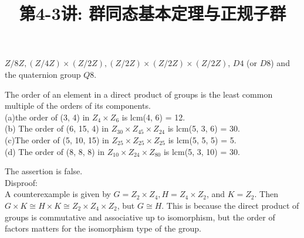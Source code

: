 \documentclass[a4paper, justified]{tufte-handout}
\title{第4-3讲: 群同态基本定理与正规子群}
\date{\zhtoday} %
\begin{document}
\maketitle
\noplagiarism %
\begin{abstract}
\end{abstract}
\beginrequired

\begin{problem}[TJ 9-11]
\end{problem}

\begin{solution}
	$Z/8Z, (Z/4Z) \times (Z/2Z), (Z/2Z) \times (Z/2Z) \times (Z/2Z)$, $D4$ (or $D8$) and the quaternion group $Q8$.
\end{solution}

\begin{problem}[TJ 9-16]
\end{problem}

\begin{solution}
	The order of an element in a direct product of groups is the least common multiple of the orders of its components.\\
	(a)the order of (3, 4) in $Z_4 \times Z_6$ is lcm(4, 6) = 12.\\
	(b) The order of (6, 15, 4) in $Z_{30} \times Z_{45} \times Z_{24}$ is lcm(5, 3, 6) = 30.\\
	(c)The order of (5, 10, 15) in $Z_{25} \times Z_{25} \times Z_{25}$ is lcm(5, 5, 5) = 5. \\
	(d) The order of (8, 8, 8) in $Z_{10} \times Z_{24} \times Z_{80}$ is lcm(5, 3, 10) = 30.
\end{solution}

\begin{problem}[TJ 9-23]
\end{problem}

\begin{solution}
	The assertion is false.\\
	Disproof:\\
	A counterexample is given by $G = Z_2 × Z_4, H = Z_4 × Z_2$, and $K = Z_2$. Then $G × K \cong  H × K \cong Z_2 × Z_4 × Z_2$, but $G \cong H$. This is because the direct product of groups is commutative and associative up to isomorphism, but the order of factors matters for the isomorphism type of the group.
\end{solution}
\end{document}
